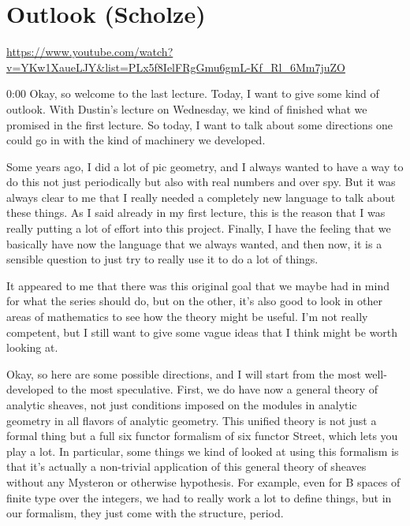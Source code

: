 
\section{\ufs Outlook (Scholze)}

\url{https://www.youtube.com/watch?v=YKw1XaueLJY&list=PLx5f8IelFRgGmu6gmL-Kf_Rl_6Mm7juZO}
\renewcommand{\yt}[2]{\href{https://www.youtube.com/watch?v=YKw1XaueLJY&list=PLx5f8IelFRgGmu6gmL-Kf_Rl_6Mm7juZO&t=#1}{#2}}
\vspace{1em}

\begin{unfinished}{0:00}
  Okay, so welcome to the last lecture. Today, I want to give some kind of outlook. With Dustin's lecture on Wednesday, we kind of finished what we promised in the first lecture. So today, I want to talk about some directions one could go in with the kind of machinery we developed.

Some years ago, I did a lot of pic geometry, and I always wanted to have a way to do this not just periodically but also with real numbers and over spy. But it was always clear to me that I really needed a completely new language to talk about these things. As I said already in my first lecture, this is the reason that I was really putting a lot of effort into this project. Finally, I have the feeling that we basically have now the language that we always wanted, and then now, it is a sensible question to just try to really use it to do a lot of things.

It appeared to me that there was this original goal that we maybe had in mind for what the series should do, but on the other, it's also good to look in other areas of mathematics to see how the theory might be useful. I'm not really competent, but I still want to give some vague ideas that I think might be worth looking at.

Okay, so here are some possible directions, and I will start from the most well-developed to the most speculative. First, we do have now a general theory of analytic sheaves, not just conditions imposed on the modules in analytic geometry in all flavors of analytic geometry. This unified theory is not just a formal thing but a full six functor formalism of six functor Street, which lets you play a lot. In particular, some things we kind of looked at using this formalism is that it's actually a non-trivial application of this general theory of sheaves without any Mysteron or otherwise hypothesis. For example, even for B spaces of finite type over the integers, we had to really work a lot to define things, but in our formalism, they just come with the structure, period.


\end{unfinished}

